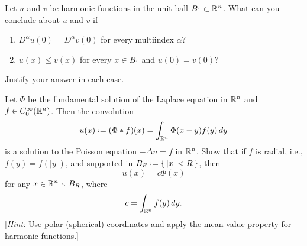 \begin{problem}
  Let \(u\) and \(v\) be harmonic functions in the unit ball
  \(B_1\subset\mathbb{R}^n\). What can you conclude about \(u\) and \(v\) if
  \begin{enumerate}[label=(\alph*),noitemsep]
  \item \(D^\alpha u(0)=D^\alpha v(0)\) for every multiindex \(\alpha\)?
  \item \(u(x)\leq v(x)\) for every \(x\in B_1\) and \(u(0)=v(0)\)?
  \end{enumerate}
  Justify your answer in each case.
\end{problem}
\begin{solution*}
\end{solution*}

\begin{problem}
  Let \(\Phi\) be the fundamental solution of the Laplace equation in
  \(\mathbb{R}^n\) and \(f\in C_0^\infty(\mathbb{R}^n)\). Then the convolution
  \[
    u(x)\defeq(\Phi* f)(x)=\int_{\bbR^n}\Phi(x-y)f(y)\diff y
  \]
  is a solution to the Poisson equation \(-\Delta u=f\) in \(\mathbb{R}^n\). Show
  that if \(f\) is radial, i.e., \(f(y)=f(|y|)\), and supported in
  \(B_R\defeq\{\,|x|<R\,\}\), then
  \[
    u(x)=c\Phi(x)
  \]
  for any \(x\in\mathbb{R}^n\smallsetminus B_R\), where
  \[
    c=\int_{\mathbb{R}^n}f(y)\mathop{}\!d y.
  \]
  [\emph{Hint:} Use polar (spherical) coordinates and apply the mean value
  property for harmonic functions.]
\end{problem}
\begin{solution*}
\end{solution*}

